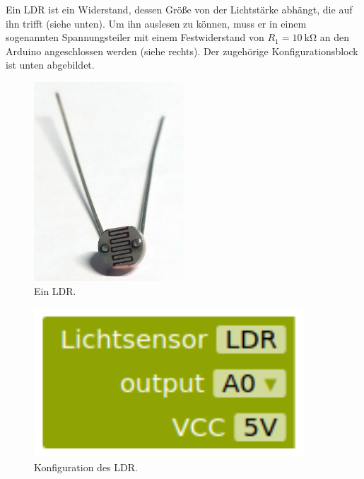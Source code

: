 \bigskip
\begin{minipage}{0.48\textwidth}
	Ein LDR ist ein Widerstand, dessen Größe von der Lichtstärke abhängt, die auf ihn trifft (siehe unten). Um ihn auslesen zu können, muss er in einem sogenannten Spannungsteiler mit einem Festwiderstand von $R_1=\SI{10}{\kilo\ohm}$ an den Arduino angeschlossen werden (siehe rechts). Der zugehörige Konfigurationsblock ist unten abgebildet.
	
	\begin{minipage}{0.48\textwidth}
		\begin{figure}[H]
			\centering
			\includegraphics[width=0.5\textwidth]{./pics/ldr2.jpg}
			\caption{Ein LDR.}
		\end{figure}
	\end{minipage}
	\hfill
	\begin{minipage}{0.48\textwidth}
		\begin{figure}[H]
			\centering
			\includegraphics[width=0.9\textwidth]{./pics/ldr-konfiguration.png}
			\caption{Konfiguration des LDR.}
		\end{figure}
	\end{minipage}
\end{minipage}
